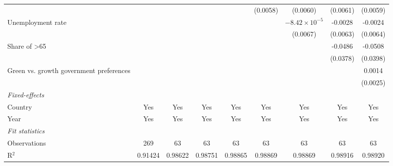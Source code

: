 \begin{table}[htbp]
\begin{tabular}{lcccccccc}
                                                                         &               &          &          &                & (0.0058)       & (0.0060)               & (0.0061)      & (0.0059)\\   
      Unemployment rate                                                  &               &          &          &                &                & $-8.42\times 10^{-5}$  & -0.0028       & -0.0024\\   
                                                                         &               &          &          &                &                & (0.0067)               & (0.0063)      & (0.0064)\\   
      Share of >65                                                       &               &          &          &                &                &                        & -0.0486       & -0.0508\\   
                                                                         &               &          &          &                &                &                        & (0.0378)      & (0.0398)\\   
      Green vs. growth government preferences                            &               &          &          &                &                &                        &               & 0.0014\\   
                                                                         &               &          &          &                &                &                        &               & (0.0025)\\   
      \midrule
      \emph{Fixed-effects}\\
      Country                                                            & Yes           & Yes      & Yes      & Yes            & Yes            & Yes                    & Yes           & Yes\\  
      Year                                                               & Yes           & Yes      & Yes      & Yes            & Yes            & Yes                    & Yes           & Yes\\  
      \midrule
      \emph{Fit statistics}\\
      Observations                                                       & 269           & 63       & 63       & 63             & 63             & 63                     & 63            & 63\\  
      R$^2$                                                              & 0.91424       & 0.98622  & 0.98751  & 0.98865        & 0.98869        & 0.98869                & 0.98916       & 0.98920\\  

\end{tabular}
\end{table}
